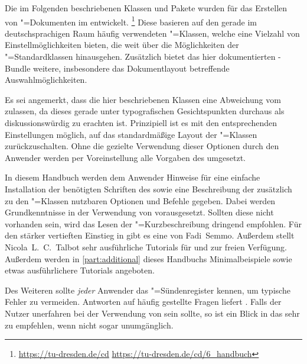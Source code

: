 \addchap*{\prefacename}
Die im Folgenden beschriebenen Klassen und Pakete wurden für das Erstellen von 
"=Dokumenten im \TUDCD entwickelt.%
\footnote{%
  \url{https://tu-dresden.de/cd}\hfill
  \url{https://tu-dresden.de/cd/6_handbuch}%
}
Diese basieren auf den gerade im deutschsprachigen Raum häufig verwendeten 
\KOMAScript"=Klassen, welche eine Vielzahl von Einstellmöglichkeiten bieten, 
die weit über die Möglichkeiten der "=Standardklassen 
hinausgehen. Zusätzlich bietet das hier dokumentierten \TUDScript-Bundle 
weitere, insbesondere das Dokumentlayout betreffende Auswahlmöglichkeiten.

Es sei angemerkt, dass die hier beschriebenen Klassen eine Abweichung vom 
\TUDCD zulassen, da dieses gerade unter typografischen Gesichtspunkten 
durchaus als diskussionswürdig zu erachten ist. Prinzipiell ist es mit den 
entsprechenden Einstellungen möglich, auf das standardmäßige Layout der 
\KOMAScript"=Klassen zurückzuschalten. Ohne die gezielte Verwendung dieser 
Optionen durch den Anwender werden per Voreinstellung alle Vorgaben des \CDs 
umgesetzt.

In diesem Handbuch werden dem Anwender Hinweise für eine einfache Installation 
der benötigten Schriften des \CDs sowie eine Beschreibung der zusätzlich zu den 
\KOMAScript"=Klassen nutzbaren Optionen und Befehle gegeben. Dabei werden 
Grundkenntnisse in der Verwendung von  vorausgesetzt. Sollten 
diese nicht vorhanden sein, wird das Lesen der "=Kurzbeschreibung
dringend empfohlen. Für den stärker vertieften Einstieg in  gibt 
es eine  von 
Fadi~Semmo. Außerdem stellt Nicola~L.~C.~Talbot sehr ausführliche Tutorials für 
und  zur 
freien Verfügung. Außerdem werden in \autoref{part:additional} dieses Handbuchs 
Minimalbeispiele sowie etwas ausführlichere Tutorials angeboten.

Des Weiteren sollte \emph{jeder} Anwender das "=Sündenregister 
kennen, um typische Fehler zu vermeiden. Antworten auf häufig gestellte Fragen 
liefert . Falls der 
Nutzer unerfahren bei der Verwendung von \KOMAScript{} sein sollte, so ist ein 
Blick in das  sehr zu empfehlen, wenn nicht 
sogar unumgänglich.

